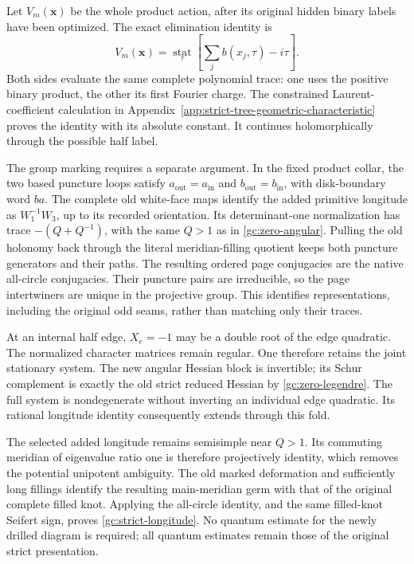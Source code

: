 Let $V_m(\mathbf x)$ be the whole product action, after its original
hidden binary labels have been optimized. The exact elimination
identity is
\begin{equation}\label{gc:zero-legendre}
 V_m(\mathbf x)=\operatorname*{stat}_{\tau}
                  \left[\sum_j b(x_j,\tau)-i\tau\right].
\end{equation}
Both sides evaluate the same complete polynomial trace: one uses
the positive binary product, the other its first Fourier charge.
The constrained Laurent-coefficient calculation in
Appendix~\ref{app:strict-tree-geometric-characteristic} proves the
identity with its absolute constant. It continues holomorphically
through the possible half label.

The group marking requires a separate argument. In the fixed
product collar, the two based puncture loops satisfy
$a_{\mathrm{out}}=a_{\mathrm{in}}$ and
$b_{\mathrm{out}}=b_{\mathrm{in}}$, with disk-boundary word $ba$.
The complete old white-face maps identify the added primitive
longitude as $W_1^{-1}W_3$, up to its recorded orientation. Its
determinant-one normalization has trace $-(Q+Q^{-1})$, with
the same $Q>1$ as in \eqref{gc:zero-angular}. Pulling the old
holonomy back through the literal meridian-filling quotient keeps
both puncture generators and their paths. The resulting ordered
page conjugacies are the native all-circle conjugacies. Their
puncture pairs are irreducible, so the page intertwiners are unique
in the projective group. This identifies representations, including
the original odd seams, rather than matching only their traces.

At an internal half edge, $X_e=-1$ may be a double root of the
edge quadratic. The normalized character matrices remain regular.
One therefore retains the joint stationary system. The new angular
Hessian block is invertible; its Schur complement is exactly the
old strict reduced Hessian by \eqref{gc:zero-legendre}. The full
system is nondegenerate without inverting an individual edge
quadratic. Its rational longitude identity consequently extends
through this fold.

The selected added longitude remains semisimple near $Q>1$.
Its commuting meridian of eigenvalue ratio one is therefore
projectively identity, which removes the potential unipotent
ambiguity. The old marked deformation and sufficiently long
fillings identify the resulting main-meridian germ with that of
the original complete filled knot. Applying the all-circle
identity, and the same filled-knot Seifert sign, proves
\eqref{gc:strict-longitude}. No quantum estimate for the newly
drilled diagram is required; all quantum estimates remain those
of the original strict presentation.

